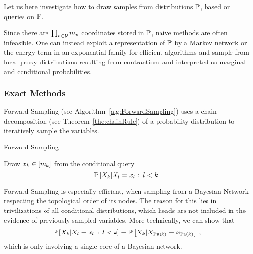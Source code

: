 Let us here investigate how to draw samples from distributions $\mathbb{P}$, based on queries on $\mathbb{P}$.

Since there are $\prod_{v\in\mathcal{V}}m_{v}$ coordinates stored in $\mathbb{P}$, naive methods are often infeasible.
One can instead exploit a representation of $\mathbb{P}$ by a Markov network or the energy term in an exponential family for efficient algorithms and sample from local proxy distributions resulting from contractions and interpreted as marginal and conditional probabilities.

\subsubsection{Exact Methods}

Forward Sampling (see Algorithm~\ref{alg:ForwardSampling}) uses a chain decomposition (see Theorem~\ref{the:chainRule}) of a probability distribution to iteratively sample the variables.

\begin{algorithm}[hbt!]
\caption{Forward Sampling}\label{alg:ForwardSampling}
\begin{algorithmic}
\For{$\catenumeratorin$}
	\State Draw $x_{k}\in[m_{k}]$ from the conditional query
		\[ \mathbb{P}\left[X_{k}|X_{l}=x_{l} \, : \, l < k\right] \]
\EndFor
\end{algorithmic}
\end{algorithm}

%
Forward Sampling is especially efficient, when sampling from a Bayesian Network respecting the topological order of its nodes.
The reason for this lies in trivilizations of all conditional distributions, which heads are not included in the evidence of previously sampled variables.
More technically, we can show that
	\[ \mathbb{P}\left[X_{k}|X_{l}=x_{l} \, : \, l < k\right]  
	= \mathbb{P}\left[X_{k}|X_{\mathrm{Pa}(k)}=x_{\mathrm{Pa}(k)}\right] \, , \]
which is only involving a single core of a Bayesian network.



